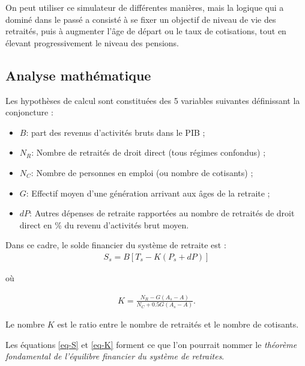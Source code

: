 \documentclass[10pt]{article}
\begin{document}

On peut utiliser ce simulateur de différentes manières, mais la 
logique qui a dominé dans le passé a consisté à se fixer un objectif 
de niveau de vie des retraités, puis à augmenter l'âge de départ ou 
le taux de cotisations, tout en élevant progressivement le niveau des pensions. 


\subsection{Analyse mathématique}

Les hypothèses de calcul sont constituées des 5 variables suivantes définissant la conjoncture :
\begin{itemize}
\item $B$: part des revenus d'activités bruts dans le PIB ;
\item $N_R$: Nombre de retraités de droit direct (tous régimes confondus) ;
\item $N_C$: Nombre de personnes en emploi (ou nombre de cotisants) ;
\item $G$: Effectif moyen d'une génération arrivant aux âges de la retraite ;
\item $dP$: Autres dépenses de retraite rapportées au nombre de retraités 
de droit direct en \% du revenu d'activités brut moyen.
\end{itemize}

Dans ce cadre, le solde financier du système de retraite est :
\begin{eqnarray}
S_s =  B [T_s - K (P_s + dP)] \label{eq-S}
\end{eqnarray}

où

\begin{eqnarray}
K = \frac{N_R - G(A_s - A)}{N_C + 0.5 G(A_s - A)}. \label{eq-K}
\end{eqnarray}

Le nombre $K$ est le ratio entre le nombre de retraités et le nombre de cotisants. 

Les équations \ref{eq-S} et \ref{eq-K} forment ce que l'on pourrait 
nommer le \emph{théorème fondamental de l'équilibre financier du système de retraites}. 
\end{document}
